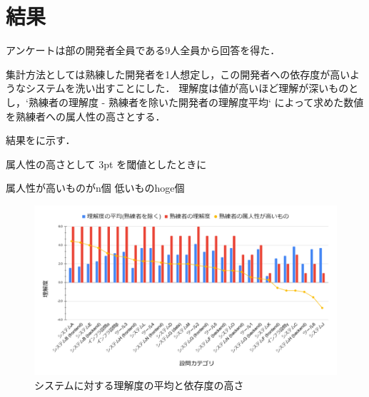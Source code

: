 \section{結果}
アンケートは部の開発者全員である9人全員から回答を得た．

集計方法としては熟練した開発者を1人想定し，この開発者への依存度が高いようなシステムを洗い出すことにした．
理解度は値が高いほど理解が深いものとし，`熟練者の理解度 - 熟練者を除いた開発者の理解度平均` によって求めた数値を熟練者への属人性の高さとする．

結果をに示す．


属人性の高さとして 3pt を閾値としたときに

属人性が高いものがn個
低いものhoge個

\begin{figure}
	\centering
	\includegraphics[keepaspectratio,width=0.9\linewidth]{img/rikai.png}
	\caption{システムに対する理解度の平均と依存度の高さ}
	\label{img:rikai}
\end{figure}

